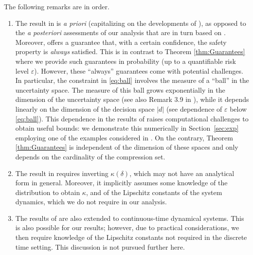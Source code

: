 The following remarks are in order.
\begin{enumerate}[wide, labelwidth=!, labelindent=0pt]
	\item The result in \cite{DBLP:journals/tac/NejatiLJSZ23} is \emph{a priori} (capitalizing on the developments of \cite{6832537}), as opposed to the \emph{a posteriori} assessments of our analysis that are in turn based on \cite{DBLP:journals/jmlr/CampiG23}.
    Moreover, \cite{DBLP:journals/tac/NejatiLJSZ23} offers a
    guarantee that, with a certain confidence, the safety property is \emph{always} satisfied. This is in contrast to Theorem \ref{thm:Guarantees} where we provide such guarantees in probability (up to a quantifiable risk level $\varepsilon$).
However, these ``always'' guarantees come with potential challenges. In particular, the constraint in \eqref{eq:ball} involves the measure of a ``ball'' in the uncertainty space. 
The measure of this ball grows exponentially in the dimension of the uncertainty space (see also Remark 3.9 in 
    \cite{6832537}), while it depends linearly on the dimension of the decision space $|d|$ (see dependence of $\varepsilon$ below \eqref{eq:ball}). This dependence in the results of \cite{DBLP:journals/tac/NejatiLJSZ23} raises computational challenges to obtain useful bounds: we demonstrate this numerically in Section~\ref{sec:exp} employing  one of the examples considered in \cite{DBLP:journals/tac/NejatiLJSZ23}. On the contrary, Theorem \ref{thm:Guarantees} is independent of the dimension of these spaces and only depends on the cardinality of the compression set. 
	\item The result in \cite{DBLP:journals/tac/NejatiLJSZ23} requires inverting $\kappa(\delta)$, which may not have an analytical form in general. Moreover, it implicitly assumes some knowledge of the distribution to obtain $\kappa$, and of the Lipschitz constants of the system dynamics, which we do not require in our analysis. 
\item The results of \cite{DBLP:journals/tac/NejatiLJSZ23} are also extended to continuous-time dynamical systems. 
This is also possible for our results; however, due to practical considerations, we then require knowledge of the Lipschitz constants not required in the discrete time setting. 
This discussion is not pursued further here. 
\end{enumerate}